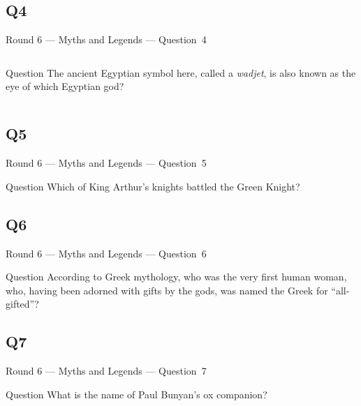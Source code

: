 \documentclass[11pt]{beamer}
\begin{document}
\subsection*{Q4}
\begin{frame}[t]{Round 6 --- Myths and Legends --- \mbox{Question 4}}
\vspace{-0.5em}
\begin{columns}[T,totalwidth=\linewidth]
\begin{column}{0.32\linewidth}
\begin{block}{Question}
The ancient Egyptian symbol here, called a \emph{wadjet}, is also known as the eye of which Egyptian god?
\end{block}
\end{column}
\begin{column}{0.65\linewidth}
\begin{center}
\texttt{[image: \{Images/wadget]}.png}
\end{center}
\end{column}
\end{columns}
\end{frame}
\subsection*{Q5}
\begin{frame}[t]{Round 6 --- Myths and Legends --- \mbox{Question 5}}
\vspace{-0.5em}
\begin{block}{Question}
Which of King Arthur's knights battled the Green Knight?
\end{block}
\end{frame}
\subsection*{Q6}
\begin{frame}[t]{Round 6 --- Myths and Legends --- \mbox{Question 6}}
\vspace{-0.5em}
\begin{block}{Question}
According to Greek mythology, who was the very first human woman, who, having been adorned with gifts by the gods, was named the Greek for ``all-gifted''?
\end{block}
\end{frame}
\subsection*{Q7}
\begin{frame}[t]{Round 6 --- Myths and Legends --- \mbox{Question 7}}
\vspace{-0.5em}
\begin{block}{Question}
What is the name of Paul Bunyan's ox companion?
\end{block}
\end{frame}
\end{document}
